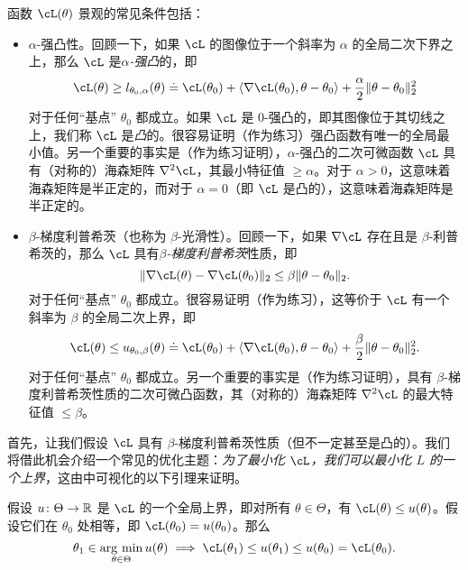 \documentclass[../../book-main.tex]{subfiles}
\begin{document}
函数 \(\cL(\theta)\) 景观的常见条件包括：
\begin{itemize}
    \item \(\alpha\)-强凸性。回顾一下，如果 \(\cL\) 的图像位于一个斜率为 \(\alpha\) 的全局二次下界之上，那么 \(\cL\) 是\textit{\(\alpha\)-强凸}的，即
    \begin{equation}
        \cL(\theta) \geq l_{\theta_{0}, \alpha}(\theta) \doteq \cL(\theta_{0}) + \ip{\nabla \cL(\theta_{0})}{\theta - \theta_{0}} + \frac{\alpha}{2}\norm{\theta - \theta_{0}}_{2}^{2}
    \end{equation}
    对于任何“基点” \(\theta_{0}\) 都成立。如果 \(\cL\) 是 \(0\)-强凸的，即其图像位于其切线之上，我们称 \(\cL\) 是\textit{凸}的。很容易证明（作为练习）强凸函数有唯一的全局最小值。另一个重要的事实是（作为练习证明），\(\alpha\)-强凸的二次可微函数 \(\cL\) 具有（对称的）海森矩阵 \(\nabla^{2}\cL\)，其最小特征值 \(\geq \alpha\)。对于 \(\alpha > 0\)，这意味着海森矩阵是半正定的，而对于 \(\alpha = 0\)（即 \(\cL\) 是凸的），这意味着海森矩阵是半正定的。
    \item \(\beta\)-梯度利普希茨（也称为 \(\beta\)-光滑性）。回顾一下，如果 \(\nabla \cL\) 存在且是 \(\beta\)-利普希茨的，那么 \(\cL\) 具有\textit{\(\beta\)-梯度利普希茨}性质，即
    \begin{equation}
        \norm{\nabla \cL(\theta) - \nabla \cL(\theta_{0})}_{2} \leq \beta \norm{\theta - \theta_{0}}_{2}.
    \end{equation}
    对于任何“基点” \(\theta_{0}\) 都成立。很容易证明（作为练习），这等价于 \(\cL\) 有一个斜率为 \(\beta\) 的全局二次上界，即
    \begin{equation}
        \cL(\theta) \leq u_{\theta_{0}, \beta}(\theta) \doteq \cL(\theta_{0}) + \ip{\nabla \cL(\theta_{0})}{\theta - \theta_{0}} + \frac{\beta}{2}\norm{\theta - \theta_{0}}_{2}^{2}.
    \end{equation}
    对于任何“基点” \(\theta_{0}\) 都成立。另一个重要的事实是（作为练习证明），具有 \(\beta\)-梯度利普希茨性质的二次可微凸函数，其（对称的）海森矩阵 \(\nabla^{2}\cL\) 的最大特征值 \(\leq \beta\)。
\end{itemize}
首先，让我们假设 \(\cL\) 具有 \(\beta\)-梯度利普希茨性质（但不一定甚至是凸的）。我们将借此机会介绍一个常见的优化主题：\textit{为了最小化 \(\cL\)，我们可以最小化 \(L\) 的一个上界}，这由中可视化的以下引理来证明。
\begin{lemma}[主化-最小化]\label{lem:majorization_minimization}
    假设 \(u \colon \Theta \to \mathbb{R}\) 是 \(\cL\) 的一个全局上界，即对所有 \(\theta \in \Theta\)，有 \(\cL(\theta) \leq u(\theta)\)。假设它们在 \(\theta_{0}\) 处相等，即 \(\cL(\theta_{0}) = u(\theta_{0})\)。那么
    \begin{equation}
        \theta_{1} \in \argmin_{\theta \in \Theta}u(\theta) \implies \cL(\theta_{1}) \leq u(\theta_{1}) \leq u(\theta_{0}) = \cL(\theta_{0}).
    \end{equation}
\end{lemma}
\end{document}
